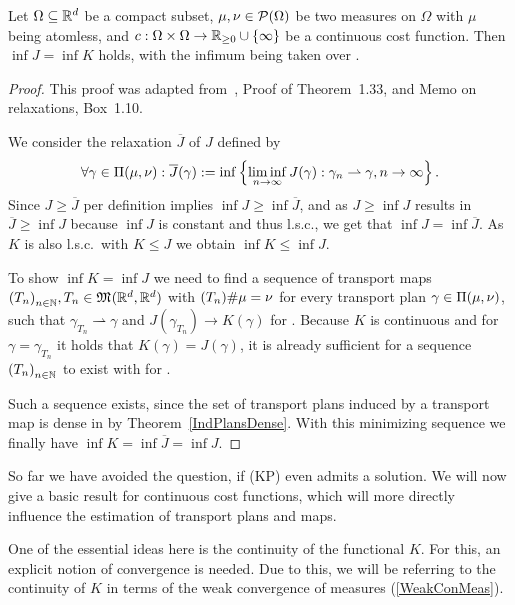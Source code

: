 \begin{theorem}\label{InfCoincide}
	Let $\Omega \subseteq \R^d$ be a compact subset, $\mu, \nu \in \PM{\Omega}$ be two measures on $\Omega$ with $\mu$ being atomless, and $\map[c]{\Omega \times \Omega}{\RZero \cup \{ \infty \}}$ be a continuous cost function. Then $\inf J = \inf K$ holds, with the infimum being taken over \TP{\mu}{\nu}.
\end{theorem}

\begin{proof}
	This proof was adapted from~\cite{San2015}, Proof of Theorem~1.33, and Memo on relaxations, Box~1.10.

	We consider the relaxation $\overline{J}$ of $J$ defined by
	\[ \forall \gamma \in \TP{\mu}{\nu}: \overline{J}(\gamma) := \inf \left\{ \liminf\limits_{\Ninf} J(\gamma) : \weak{\gamma_n}{\gamma}, \Ninf \right\}. \]
	Since $J \ge \overline{J}$ per definition implies $\inf J \ge \inf \overline{J}$, and as $J \ge \inf J$ results in $\overline{J} \ge \inf J$ because $\inf J$ is constant and thus l.s.c., we get that $\inf J = \inf \overline{J}$. As $K$ is also l.s.c.\ with $K \le J$ we obtain $\inf K \le \inf J$.

	To show $\inf K = \inf J$ we need to find a sequence of transport maps ${(T_n)}_{\NinN}, T_n \in \MF{\R^d}{\R^d}$ with $\push[(T_n)]{\mu} = \nu$ for every transport plan $\gamma \in \TP{\mu}{\nu}$, such that $\gamma_{T_n} \rightharpoonup \gamma$ and $J(\gamma_{T_n}) \rightarrow K(\gamma)$ for \Ninf. Because $K$ is continuous and for $\gamma = \gamma_{T_n}$ it holds that $K(\gamma) = J(\gamma)$, it is already sufficient for a sequence ${(T_n)}_{\NinN}$ to exist with  for \Ninf.

	Such a sequence exists, since the set of transport plans induced by a transport map is dense in \TP{\mu}{\nu} by Theorem~\ref{IndPlansDense}. With this minimizing sequence we finally have $\inf K = \inf \overline{J} = \inf J$.
\end{proof}

So far we have avoided the question, if (KP) even admits a solution. We will now give a basic result for continuous cost functions, which will more directly influence the estimation of transport plans and maps.

One of the essential ideas here is the continuity of the functional $K$. For this, an explicit notion of convergence is needed. Due to this, we will be referring to the continuity of $K$ in terms of the weak convergence of measures (\ref{WeakConMeas}).

